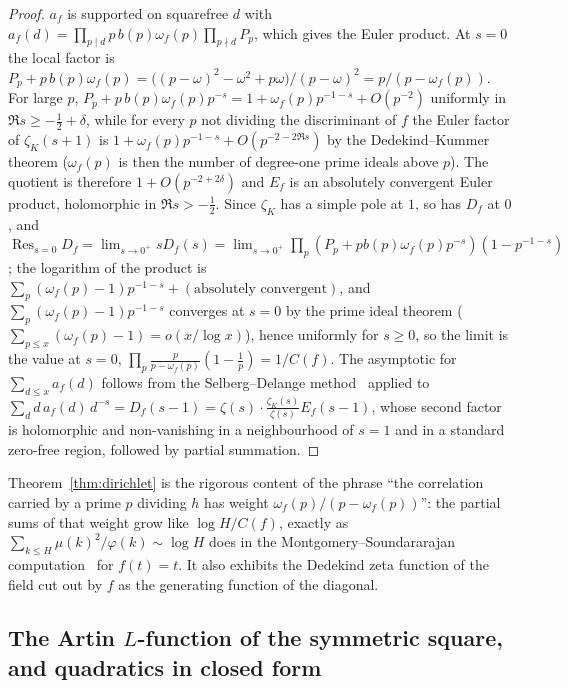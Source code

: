 \documentclass[11pt,a4paper]{article}
\theoremstyle{remark}\newtheorem{remark}[theorem]{Remark}
\begin{document}
\begin{proof}
$a_f$ is supported on squarefree $d$ with $a_f(d)=\prod_{p\mid d}p\,b(p)\omega_f(p)\prod_{p\nmid d}P_p$,
which gives the Euler product. At $s=0$ the local factor is
$P_p+p\,b(p)\omega_f(p)=\bigl((p-\omega)^2-\omega^2+p\omega\bigr)/(p-\omega)^2=p/(p-\omega_f(p))$. For
large $p$, $P_p+p\,b(p)\omega_f(p)p^{-s}=1+\omega_f(p)p^{-1-s}+O(p^{-2})$ uniformly in $\Re s\ge-\tfrac12+\delta$,
while for every $p$ not dividing the discriminant of $f$ the Euler factor of $\zeta_K(s+1)$ is
$1+\omega_f(p)p^{-1-s}+O(p^{-2-2\Re s})$ by the Dedekind--Kummer theorem ($\omega_f(p)$ is then the
number of degree-one prime ideals above $p$).
The quotient is therefore $1+O(p^{-2+2\delta})$ and $E_f$ is an absolutely convergent Euler product, holomorphic
in $\Re s>-\tfrac12$. Since $\zeta_K$ has a simple pole at $1$, so has $D_f$ at $0$, and
$\operatorname*{Res}_{s=0}D_f=\lim_{s\to0^+}sD_f(s)=\lim_{s\to0^+}\prod_p(P_p+pb(p)\omega_f(p)p^{-s})(1-p^{-1-s})$;
the logarithm of the product is $\sum_p(\omega_f(p)-1)p^{-1-s}+(\text{absolutely convergent})$, and
$\sum_p(\omega_f(p)-1)p^{-1-s}$ converges at $s=0$ by the prime ideal theorem ($\sum_{p\le x}(\omega_f(p)-1)=o(x/\log x)$),
hence uniformly for $s\ge0$, so the limit is the value at $s=0$, $\prod_p\frac{p}{p-\omega_f(p)}(1-\frac1p)=1/C(f)$.
The asymptotic for $\sum_{d\le x}a_f(d)$ follows from the Selberg--Delange method~\cite[II.5]{Tenenbaum2015}
applied to $\sum_d d\,a_f(d)\,d^{-s}=D_f(s-1)=\zeta(s)\cdot\frac{\zeta_K(s)}{\zeta(s)}E_f(s-1)$, whose second
factor is holomorphic and non-vanishing in a neighbourhood of $s=1$ and in a standard zero-free region,
followed by partial summation.
\end{proof}

Theorem~\ref{thm:dirichlet} is the rigorous content of the phrase ``the correlation carried by a prime
$p$ dividing $h$ has weight $\omega_f(p)/(p-\omega_f(p))$'': the partial sums of that weight grow like
$\log H/C(f)$, exactly as $\sum_{k\le H}\mu(k)^2/\varphi(k)\sim\log H$ does in the
Montgomery--Soundararajan computation~\cite{MontgomerySoundararajan2004} for $f(t)=t$. It also exhibits
the Dedekind zeta function of the field cut out by $f$ as the generating function of the diagonal.

\subsection{The Artin $L$-function of the symmetric square, and quadratics in closed form}\label{sec:artin}
\end{document}
